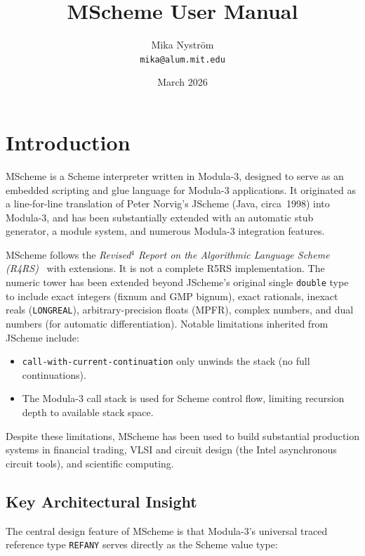 \documentclass[12pt]{report}
\title{\bfseries\sffamily\fontsize{24.88}{30}\selectfont
  MScheme User Manual}
\author{Mika Nystr\"om \\ {\tt mika@alum.mit.edu}}
\date{March 2026}
\begin{document}
\maketitle
\thispagestyle{empty}

\newpage
\tableofcontents
\newpage

\chapter{Introduction}

MScheme is a Scheme interpreter written in Modula-3, designed to serve
as an embedded scripting and glue language for Modula-3 applications.
It originated as a line-for-line translation of Peter Norvig's JScheme
(Java, circa~1998) into Modula-3, and has been substantially extended
with an automatic stub generator, a module system, and numerous
Modula-3 integration features.

MScheme follows the \emph{Revised$^4$ Report on the Algorithmic Language
Scheme (R4RS)}~\cite{r4rs} with extensions.  It is not a complete R5RS
implementation.  The numeric tower has been extended beyond
JScheme's original single {\tt double} type to include exact integers
(fixnum and GMP bignum), exact rationals, inexact reals
({\tt LONGREAL}), arbitrary-precision floats (MPFR), complex numbers,
and dual numbers (for automatic differentiation).
Notable limitations inherited from JScheme include:

\begin{itemize}
\item {\tt call-with-current-continuation} only unwinds the stack
  (no full continuations).
\item The Modula-3 call stack is used for Scheme control flow, limiting
  recursion depth to available stack space.
\end{itemize}

Despite these limitations, MScheme has been used to build substantial
production systems in financial trading, VLSI and circuit design (the Intel
asynchronous circuit tools), and scientific computing.

\section{Key Architectural Insight}

The central design feature of MScheme is that Modula-3's universal
traced reference type {\tt REFANY} serves directly as the Scheme value
type:
\end{document}
